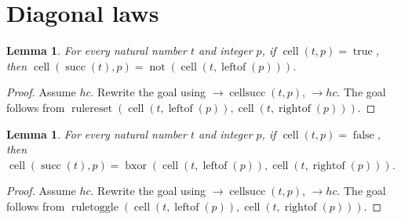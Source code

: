 \documentclass[11pt]{article}
\newtheorem{lemma}[theorem]{Lemma}
\theoremstyle{definition}
\begin{document}
\section{Diagonal laws}
\label{ll:paper:diagonal-laws}
\begin{lemma}
\label{ll:paper:reset}
For every natural number \(t\) and integer \(p\), if \(\operatorname{cell}(t, p) = \operatorname{true}\), then \(\operatorname{cell}(\operatorname{succ}(t), p) = \operatorname{not}(\operatorname{cell}(t, \operatorname{leftof}(p)))\).
\end{lemma}
\begin{proof}
Assume \(hc\).
Rewrite the goal using \(\rightarrow \operatorname{cellsucc}(t, p)\), \(\rightarrow hc\).
The goal follows from \(\operatorname{rulereset}(\operatorname{cell}(t, \operatorname{leftof}(p)), \operatorname{cell}(t, \operatorname{rightof}(p)))\).
\end{proof}
\begin{lemma}
\label{ll:paper:toggle}
For every natural number \(t\) and integer \(p\), if \(\operatorname{cell}(t, p) = \operatorname{false}\), then \(\operatorname{cell}(\operatorname{succ}(t), p) = \operatorname{bxor}(\operatorname{cell}(t, \operatorname{leftof}(p)), \operatorname{cell}(t, \operatorname{rightof}(p)))\).
\end{lemma}
\begin{proof}
Assume \(hc\).
Rewrite the goal using \(\rightarrow \operatorname{cellsucc}(t, p)\), \(\rightarrow hc\).
The goal follows from \(\operatorname{ruletoggle}(\operatorname{cell}(t, \operatorname{leftof}(p)), \operatorname{cell}(t, \operatorname{rightof}(p)))\).
\end{proof}
\end{document}
